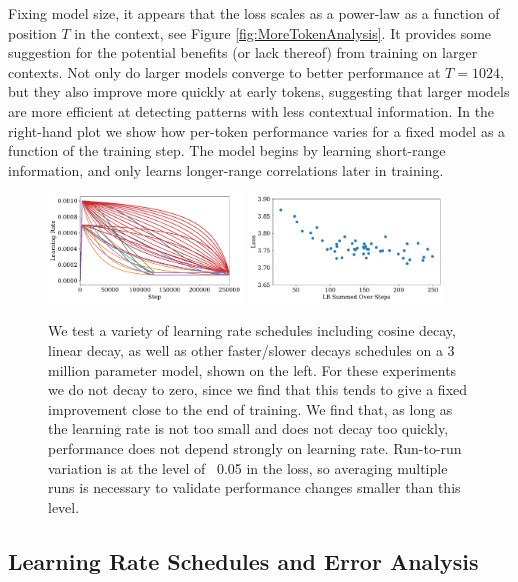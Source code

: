 \documentclass[english]{article}
\begin{document}
Fixing model size, it appears that the loss scales as a power-law as a function of position $T$ in the context, see Figure \ref{fig:MoreTokenAnalysis}.  It provides some suggestion for the potential benefits (or lack thereof) from training on larger contexts.  Not only do larger models converge to better performance at $T=1024$, but they also improve more quickly at early tokens, suggesting that larger models are more efficient at detecting patterns with less contextual information.  In the right-hand plot we show how per-token performance varies for a fixed model as a function of the training step.  The model begins by learning short-range information, and only learns longer-range correlations later in training.

\begin{figure}
\noindent \centering{} 
\includegraphics[width=0.46\textwidth]{VariousLearningSchedules} 
\includegraphics[width=0.46\textwidth]{LearningRateSchedulesvsPerformance} 
 \caption[Learning rate schedule scan]{
 We test a variety of learning rate schedules including cosine decay, linear decay, as well as other faster/slower decays schedules on a 3 million parameter model, shown on the left.
 For these experiments we do not decay to zero, since we find that this tends to give a fixed improvement close to the end of training.
 We find that, as long as the learning rate is not too small and does not decay too quickly, performance does not depend strongly on learning rate.
 Run-to-run variation is at the level of ~0.05 in the loss, so averaging multiple runs is necessary to validate performance changes smaller than this level.
 \label{fig:LearningRateSchedules} }
\end{figure}

\subsection{Learning Rate Schedules and Error Analysis}
\label{app:OptimizationDetailsandErrorAnalysis}
\end{document}
